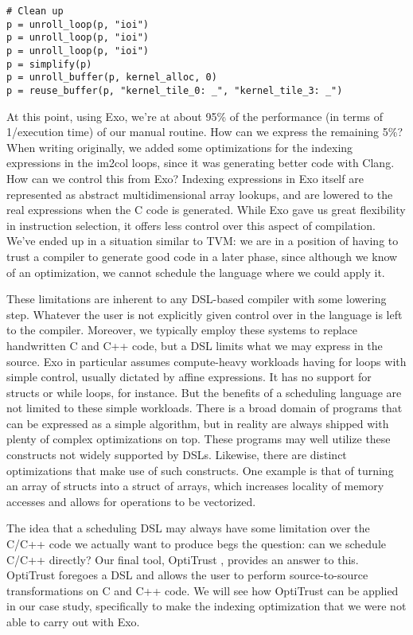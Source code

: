 \documentclass[acmsmall, nonacm=true]{acmart}
\begin{document}
\begin{verbatim}
# Clean up
p = unroll_loop(p, "ioi")
p = unroll_loop(p, "ioi")
p = unroll_loop(p, "ioi")
p = simplify(p)
p = unroll_buffer(p, kernel_alloc, 0)
p = reuse_buffer(p, "kernel_tile_0: _", "kernel_tile_3: _")
\end{verbatim}

At this point, using Exo, we're at about 95\% of the performance (in terms of 1/execution time) of our manual routine. How can we express the remaining 5\%? When writing originally, we added some optimizations for the indexing expressions in the im2col loops, since it was generating better code with Clang. How can we control this from Exo? Indexing expressions in Exo itself are represented as abstract multidimensional array lookups, and are lowered to the real expressions when the C code is generated. While Exo gave us great flexibility in instruction selection, it offers less control over this aspect of compilation. We've ended up in a situation similar to TVM: we are in a position of having to trust a compiler to generate good code in a later phase, since although we know of an optimization, we cannot schedule the language where we could apply it. 

These limitations are inherent to any DSL-based compiler with some lowering step. Whatever the user is not explicitly given control over in the language is left to the compiler. Moreover, we typically employ these systems to replace handwritten C and C++ code, but a DSL limits what we may express in the source. Exo in particular assumes compute-heavy workloads having for loops with simple control, usually dictated by affine expressions. It has no support for structs or while loops, for instance. But the benefits of a scheduling language are not limited to these simple workloads. There is a broad domain of programs that can be expressed as a simple algorithm, but in reality are always shipped with plenty of complex optimizations on top. These programs may well utilize these constructs not widely supported by DSLs. Likewise, there are distinct optimizations that make use of such constructs. One example is that of turning an array of structs into a struct of arrays, which increases locality of memory accesses and allows for operations to be vectorized. 

The idea that a scheduling DSL may always have some limitation over the C/C++ code we actually want to produce begs the question: can we schedule C/C++ directly? Our final tool, OptiTrust \cite{chargueraud:hal-03773485}, provides an answer to this. OptiTrust foregoes a DSL and allows the user to perform source-to-source transformations on C and C++ code. We will see how OptiTrust can be applied in our case study, specifically to make the indexing optimization that we were not able to carry out with Exo.
\end{document}
